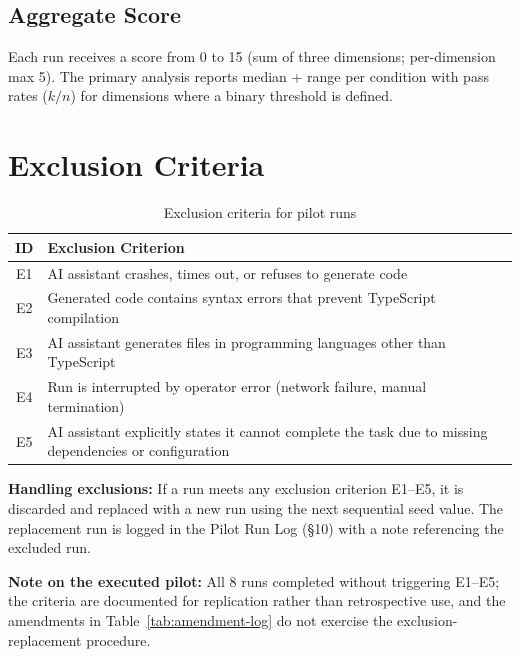 \subsection{Aggregate Score}

Each run receives a score from 0 to 15 (sum of three dimensions; per-dimension max 5). The primary analysis reports median + range per condition with pass rates ($k/n$) for dimensions where a binary threshold is defined.


\section{Exclusion Criteria}

\begin{table}[H]
\centering
\begin{tabular}{cp{10cm}}
\toprule
\textbf{ID} & \textbf{Exclusion Criterion} \\
\midrule
E1 & AI assistant crashes, times out, or refuses to generate code \\
E2 & Generated code contains syntax errors that prevent TypeScript compilation \\
E3 & AI assistant generates files in programming languages other than TypeScript \\
E4 & Run is interrupted by operator error (network failure, manual termination) \\
E5 & AI assistant explicitly states it cannot complete the task due to missing dependencies or configuration \\
\bottomrule
\end{tabular}
\caption{Exclusion criteria for pilot runs}
\label{tab:exclusion-criteria}
\end{table}

\textbf{Handling exclusions:} If a run meets any exclusion criterion E1--E5, it is discarded and replaced with a new run using the next sequential seed value. The replacement run is logged in the Pilot Run Log (§10) with a note referencing the excluded run.

\textbf{Note on the executed pilot:} All 8 runs completed without triggering E1--E5; the criteria are documented for replication rather than retrospective use, and the amendments in Table~\ref{tab:amendment-log} do not exercise the exclusion-replacement procedure.

